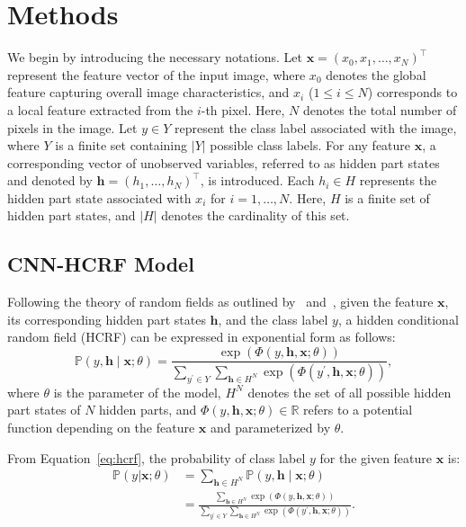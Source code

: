 \documentclass[conference]{IEEEtran}
\newcommand{\hb}{\mathbf{h}}
\newcommand{\PP}{{\mathbb{P}}}
\newcommand{\xb}{\mathbf{x}}
\newcommand{\RR}{{\mathbb{R}}}
\begin{document}
\section{Methods}


We begin by introducing the necessary notations.
Let $\xb = (x_0, x_1, \dots, x_N)^\top$ represent the feature vector of the
input image, where $x_0$ denotes the global feature capturing overall image
characteristics, and $x_i$ ($1 \leq i \leq N$) corresponds to a local feature
extracted from the $i$-th pixel. Here, $N$ denotes the total number of pixels
in the image. Let $y \in Y$ represent the class label associated with the image,
where $Y$ is a finite set containing $\vert Y \vert$ possible class labels.
For any feature $\xb$, a corresponding vector of unobserved variables, referred
to as hidden part states and denoted by $\hb = (h_1, \dots, h_N)^\top$,
is introduced. Each $h_i \in H$ represents the hidden part state associated
with $x_i$ for $i = 1, \dots, N$. Here, $H$ is a finite set of hidden part
states, and $\vert H \vert$ denotes the cardinality of this set.


\subsection{CNN-HCRF Model}


Following the theory of random fields as outlined
by~\citet{quattoni2004conditional} and~\citet{wang2006hidden},
given the feature $\xb$, its corresponding hidden part states $\hb$,
and the class label $y$, a hidden conditional random field (HCRF) can be
expressed in exponential form as follows:
\begin{equation}
\label{eq:hcrf}
\PP(y, \hb \mid \xb; \theta)
= \frac{\exp\left(\Phi(y, \hb, \xb; \theta)\right)}
{\sum_{y^\prime \in Y} \sum_{\hb \in H^N}
\exp\left(\Phi(y^\prime, \hb, \xb; \theta)\right)},
\end{equation}
where $\theta$ is the parameter of the model,
$H^N$ denotes the set of all possible hidden part states of $N$ hidden parts,
and $\Phi(y, \hb, \xb; \theta) \in \RR$ refers to a potential function
depending on the feature $\xb$ and parameterized by $\theta$.


From Equation~\ref{eq:hcrf}, the probability of class label $y$ for the given
feature $\xb$ is:
\begin{equation*}
\begin{split}
\PP(y \vert \xb; \theta) &= \sum_{\hb \in H^N} \PP(y, \hb \mid \xb; \theta) \\
&= \frac{\sum_{\hb \in H^N} \exp\left(\Phi(y, \hb, \xb; \theta)\right)}
{\sum_{y^\prime \in Y} \sum_{\hb \in H^N}
\exp\left(\Phi(y^\prime, \hb, \xb; \theta)\right)}.
\end{split}
\end{equation*}
\end{document}
